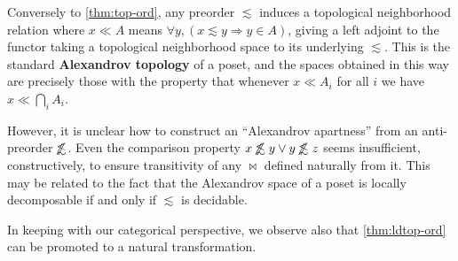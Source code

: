 \documentclass{article}
\def\oapt{\mathrel{\!\not\,\not\lesssim}}
\def\leapx{\lesssim}
\let\implies\Rightarrow
\def\inv{^{-1}}
\begin{document}
\begin{rmk}
  Conversely to \cref{thm:top-ord}, any preorder $\leapx$ induces a topological neighborhood relation where $x\ll A$ means $\forall y, (x\leapx y \implies y\in A)$, giving a left adjoint to the functor taking a topological neighborhood space to its underlying $\leapx$.
  This is the standard \textbf{Alexandrov topology} of a poset, and the spaces obtained in this way are precisely those with the property that whenever $x\ll A_i$ for all $i$ we have $x\ll \bigcap_i A_i$.
  


  However, it is unclear how to construct an ``Alexandrov apartness'' from an anti-preorder $\oapt$.
  Even the comparison property $x\oapt y \lor y\oapt z$ seems insufficient, constructively, to ensure transitivity of any $\bowtie$ defined naturally from it.
  This may be related to the fact that the Alexandrov space of a poset is locally decomposable if and only if $\leapx$ is decidable.
\end{rmk}

In keeping with our categorical perspective, we observe also that \cref{thm:ldtop-ord} can be promoted to a natural transformation.
\end{document}
